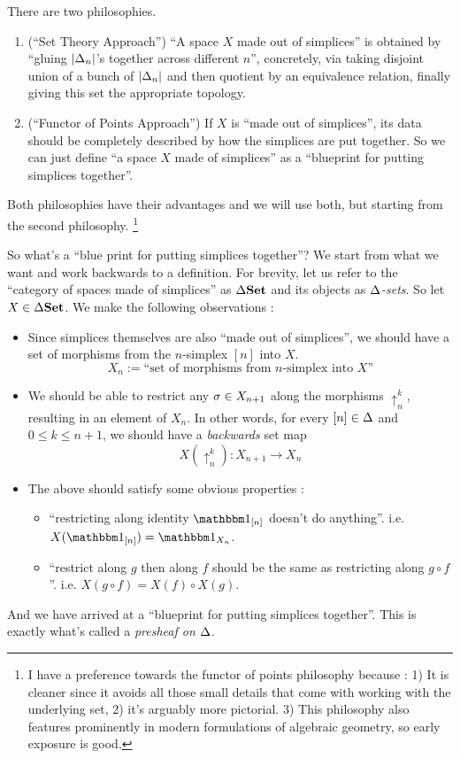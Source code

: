 \documentclass{article}
\begin{document}
\begin{rmk}  
  There are two philosophies. 
  \begin{enumerate}
    \item (``Set Theory Approach'') ``A space $X$ made out of simplices'' is 
    obtained by ``gluing $\left\vert \Delta_n \right\vert$'s together across different $n$'',
    concretely, via taking disjoint union of a bunch of $\left\vert \Delta_n \right\vert$ and 
    then quotient by an equivalence relation,
    finally giving this set the appropriate topology.
    \item (``Functor of Points Approach'')
    If $X$ is ``made out of simplices'',
    its data should be completely described by 
    how the simplices are put together.
    So we can just define ``a space $X$ made of simplices''
    as a ``blueprint for putting simplices together''.
  \end{enumerate}
  Both philosophies have their advantages and we will use both,
  but starting from the second philosophy.
  \footnote{
    I have a preference towards the functor of points philosophy because : 
    1) It is cleaner 
    since it avoids all those small details that come with 
    working with the underlying set,
    2) it's arguably more pictorial.
    3) This philosophy also features prominently in modern formulations of 
    algebraic geometry,
    so early exposure is good. 
  }

  So what's a ``blue print for putting simplices together''?
  We start from what we want and work backwards to a definition.
  For brevity, let us refer to the ``category of spaces made of simplices'' as 
  $\Delta\mathbf{Set}$ and its objects as \emph{$\Delta$-sets}.
  So let $X \in \Delta\mathbf{Set}$.
  We make the following observations : 
  \begin{itemize}
    \item Since simplices themselves are also ``made out of simplices'',
    we should have a set of morphisms from the $n$-simplex $[n]$ into $X$.
    \[ X_n := \text{``set of morphisms from $n$-simplex into $X$''} \]
    \item We should be able to restrict any $\sigma \in X_{n+1}$ along 
    the morphisms $\uparrow_n^k$,
    resulting in an element of $X_n$.
    In other words, for every $[n] \in \Delta$ and $0 \leq k \leq n+1$,
    we should have a \emph{backwards} set map \[
      X(\uparrow_n^k) : X_{n+1} \to X_n
    \]
    \item The above should satisfy some obvious properties : 
    \begin{itemize}
      \item ``restricting along identity $\id{[n]}$ doesn't do anything''.
      i.e. $X(\id{[n]}) = \id{X_n}$.
      \item ``restrict along $g$ then along $f$ should be the same as 
      restricting along $g \circ f$''.
      i.e. $X(g \circ f) = X(f) \circ X(g)$.
    \end{itemize}
  \end{itemize}
  And we have arrived at a ``blueprint for putting simplices together''.
  This is exactly what's called a \emph{presheaf on $\Delta$}.


\end{rmk}
\end{document}
